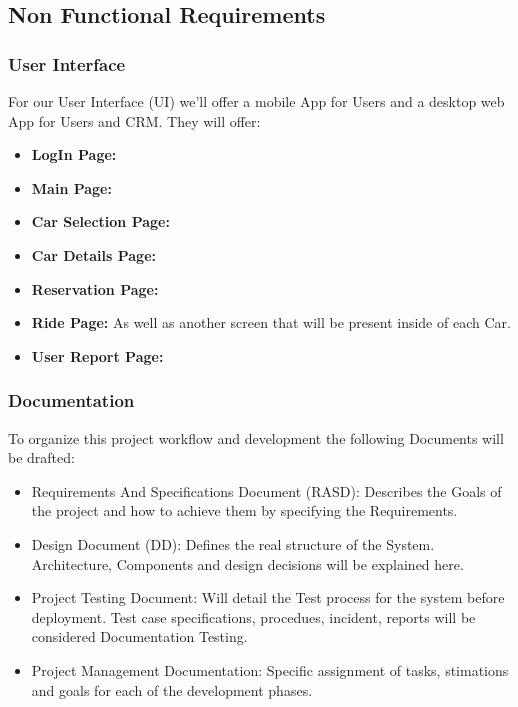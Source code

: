 \documentclass[a4paper]{article}
\begin{document}
\subsection{Non Functional Requirements}
\subsubsection{User Interface}
For our User Interface (UI) we'll offer a mobile App for Users and a desktop web App for Users and CRM. They will offer:
\begin {itemize}
\item \textbf{LogIn Page:}
\item \textbf{Main Page:}
\item \textbf{Car Selection Page:}
\item \textbf{Car Details Page:}
\item \textbf{Reservation Page:}
\item \textbf{Ride Page:} As well as another screen that will be present inside of each Car.
\item \textbf{User Report Page:}
\end{itemize}
\subsubsection{Documentation}
To organize this project workflow and development the following Documents will be drafted:
\begin {itemize}
\item Requirements And Specifications Document (RASD): Describes the Goals of the project and how to achieve them by specifying the Requirements.
\item Design Document (DD): Defines the real structure of the System. Architecture, Components and design decisions will be explained here.
\item Project Testing Document: Will detail the Test process for the system before deployment. Test case specifications, procedues, incident, reports will be considered Documentation Testing.
\item Project Management Documentation: Specific assignment of tasks, stimations and goals for each of the development phases.
\end{itemize}
\end{document}
